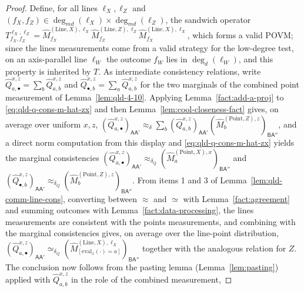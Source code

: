 \begin{proof}
	Define, for all lines $\ell_X, \ell_Z$ and
	$(f_X, f_Z) \in \deg_{md}(\ell_X) \times \deg_{md}(\ell_Z)$, the sandwich
	operator
	$T^{\ell_X,\ell_Z}_{f_X,f_Z}
	= \hat{M}^{(\mathrm{Line},X),\ell_X}_{f_X}
	\hat{M}^{(\mathrm{Line},Z),\ell_Z}_{f_Z}
	\hat{M}^{(\mathrm{Line},X),\ell_X}_{f_X}$,
	which forms a valid POVM; since the lines measurements come from a valid
	strategy for the low-degree test, on an axis-parallel line $\ell_W$ the
	outcome $f_W$ lies in $\deg_d(\ell_W)$, and this property is inherited by
	$T$. As intermediate consistency relations, write
	$\hat{Q}^{x,z}_{a,\bullet} = \sum_b \hat{Q}^{x,z}_{a,b}$ and
	$\hat{Q}^{x,z}_{\bullet,b} = \sum_a \hat{Q}^{x,z}_{a,b}$ for the two
	marginals of the combined point measurement of
	Lemma~\ref{lem:qld-4-10}. Applying
	Lemma~\ref{fact:add-a-proj} to \eqref{eq:qld-q-cons-m-hat-zx} and then
	Lemma~\ref{lem:cool-closeness-fact} gives, on average over uniform
	$x, z$,
	$(\hat{Q}^{x,z}_{a,\bullet})_{\mathsf{A}\mathsf{A}'}
	\approx_\delta
	\sum_b (\hat{Q}^{x,z}_{a,b})_{\mathsf{A}\mathsf{A}'}
	(\hat{M}^{(\mathrm{Point},Z),z}_{b})_{\mathsf{B}\mathsf{A}''}$,
	and a direct norm computation from this display and
	\eqref{eq:qld-q-cons-m-hat-zx} yields the marginal consistencies
	$(\hat{Q}^{x,z}_{a,\bullet})_{\mathsf{A}\mathsf{A}'} \approx_{\delta_Q}
	(\hat{M}^{(\mathrm{Point},X),x}_{a})_{\mathsf{B}\mathsf{A}''}$ and
	$(\hat{Q}^{x,z}_{\bullet,b})_{\mathsf{A}\mathsf{A}'} \approx_{\delta_Q}
	(\hat{M}^{(\mathrm{Point},Z),z}_{b})_{\mathsf{B}\mathsf{A}''}$.
	From items 1 and 3 of Lemma~\ref{lem:qld-comm-line-cons}, converting
	between $\approx$ and $\simeq$ with Lemma~\ref{fact:agreement} and
	summing outcomes with Lemma~\ref{fact:data-processing}, the lines
	measurements are consistent with the points measurements, and combining
	with the marginal consistencies gives, on average over the line-point
	distribution,
	$(\hat{Q}^{x,z}_{a,\bullet})_{\mathsf{A}\mathsf{A}'} \simeq_{\delta_Q}
	(\hat{M}^{(\mathrm{Line},X),\ell_X}
	_{[\mathrm{eval}_x(\cdot)=a]})_{\mathsf{B}\mathsf{A}''}$
	together with the analogous relation for $Z$. The conclusion now follows
	from the pasting lemma (Lemma~\ref{lem:pasting}) applied with
	$\hat{Q}^{x,z}_{a,b}$ in the role of the combined measurement,

\end{proof}
